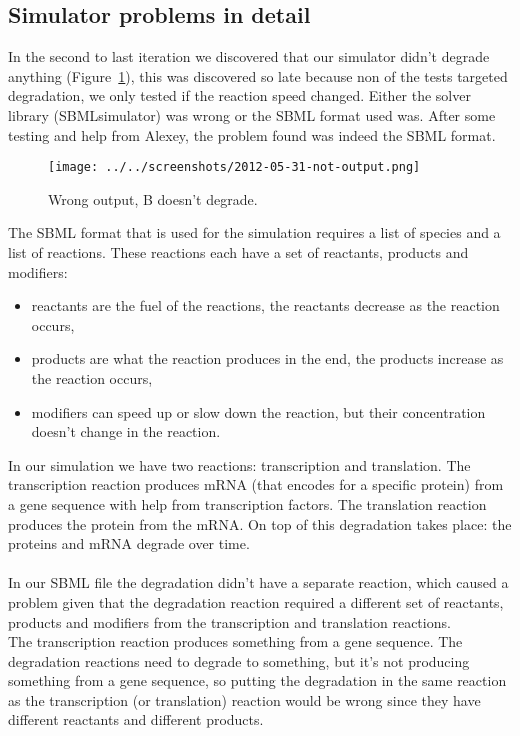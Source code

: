 \subsection{Simulator problems in detail}
\label{simulator-problems}
In the second to last iteration we discovered that our simulator didn't degrade anything (Figure~\ref{fig:wrong}), this was discovered so late because non of the tests targeted degradation, we only tested if the reaction speed changed. Either the solver library (SBMLsimulator) was wrong or the SBML format used was. After some testing and help from Alexey, the problem found was indeed the SBML format.\\

\begin{figure}[h!]
	\centering\texttt{[image: ../../screenshots/2012-05-31-not-output.png]}
	\caption{Wrong output, B doesn't degrade.}
	\label{fig:wrong}
\end{figure}

\noindent The SBML format that is used for the simulation requires a list of species and a list of reactions. These reactions each have a set of reactants, products and modifiers:
\begin{itemize}
	\item reactants are the fuel of the reactions, the reactants decrease as the reaction occurs,
	\item products are what the reaction produces in the end, the products increase as the reaction occurs,
	\item modifiers can speed up or slow down the reaction, but their concentration doesn't change in the reaction.
\end{itemize}
In our simulation we have two reactions: transcription and translation. The transcription reaction produces mRNA (that encodes for a specific protein) from a gene sequence with help from transcription factors. The translation reaction produces the protein from the mRNA. On top of this degradation takes place: the proteins and mRNA degrade over time.\\
\\
In our SBML file the degradation didn't have a separate reaction, which caused a problem given that the degradation reaction required a different set of reactants, products and modifiers from the transcription and translation reactions.\\
The transcription reaction produces something from a gene sequence. The degradation reactions need to degrade to something, but it's not producing something from a gene sequence, so putting the degradation in the same reaction as the transcription (or translation) reaction would be wrong since they have different reactants and different products.\\

